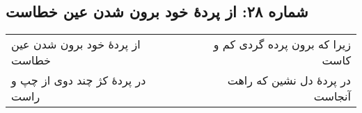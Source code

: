 \begin{center}
\section*{شماره ۲۸: از پردۀ خود برون شدن عین خطاست}
\label{sec:028}
\begin{longtable}{l p{0.5cm} r}
از پردهٔ خود برون شدن عین خطاست
&&
زیرا که برون پرده گردی کم و کاست
\\
در پردهٔ کژ چند دوی از چپ و راست
&&
در پردهٔ دل نشین که راهت آنجاست
\\
\end{longtable}
\end{center}
